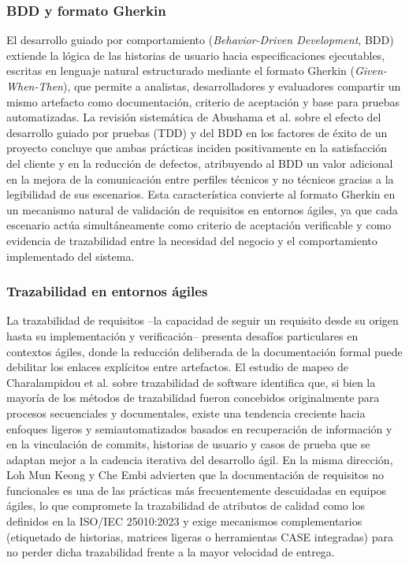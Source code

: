 \documentclass[journal,onecolumn]{IEEEtran}
\begin{document}
	\subsubsection{BDD y formato Gherkin}
	
	El desarrollo guiado por comportamiento (\textit{Behavior-Driven Development}, BDD) extiende la lógica de las historias de usuario hacia especificaciones ejecutables, escritas en lenguaje natural estructurado mediante el formato Gherkin (\textit{Given-When-Then}), que permite a analistas, desarrolladores y evaluadores compartir un mismo artefacto como documentación, criterio de aceptación y base para pruebas automatizadas. La revisión sistemática de Abushama et al. \cite{Abushama2021} sobre el efecto del desarrollo guiado por pruebas (TDD) y del BDD en los factores de éxito de un proyecto concluye que ambas prácticas inciden positivamente en la satisfacción del cliente y en la reducción de defectos, atribuyendo al BDD un valor adicional en la mejora de la comunicación entre perfiles técnicos y no técnicos gracias a la legibilidad de sus escenarios. Esta característica convierte al formato Gherkin en un mecanismo natural de validación de requisitos en entornos ágiles, ya que cada escenario actúa simultáneamente como criterio de aceptación verificable y como evidencia de trazabilidad entre la necesidad del negocio y el comportamiento implementado del sistema.
	
	\subsubsection{Trazabilidad en entornos ágiles}
	
	La trazabilidad de requisitos --la capacidad de seguir un requisito desde su origen hasta su implementación y verificación-- presenta desafíos particulares en contextos ágiles, donde la reducción deliberada de la documentación formal puede debilitar los enlaces explícitos entre artefactos. El estudio de mapeo de Charalampidou et al. \cite{Charalampidou2021} sobre trazabilidad de software identifica que, si bien la mayoría de los métodos de trazabilidad fueron concebidos originalmente para procesos secuenciales y documentales, existe una tendencia creciente hacia enfoques ligeros y semiautomatizados basados en recuperación de información y en la vinculación de commits, historias de usuario y casos de prueba que se adaptan mejor a la cadencia iterativa del desarrollo ágil. En la misma dirección, Loh Mun Keong y Che Embi \cite{LohMunKeong2022} advierten que la documentación de requisitos no funcionales es una de las prácticas más frecuentemente descuidadas en equipos ágiles, lo que compromete la trazabilidad de atributos de calidad como los definidos en la ISO/IEC 25010:2023 \cite{ISO25010-2023} y exige mecanismos complementarios (etiquetado de historias, matrices ligeras o herramientas CASE integradas) para no perder dicha trazabilidad frente a la mayor velocidad de entrega.
	
\end{document}
